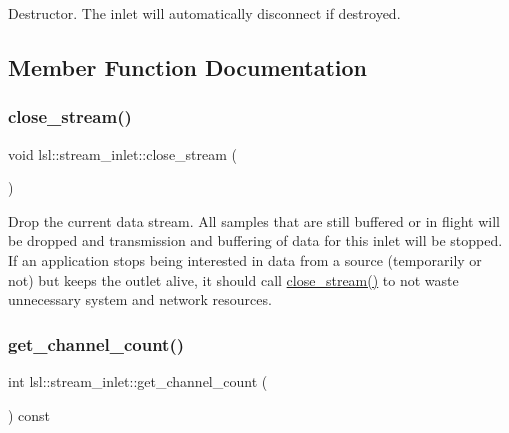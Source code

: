 Destructor. The inlet will automatically disconnect if destroyed. 

\subsection{Member Function Documentation}
\mbox{\label{classlsl_1_1stream__inlet_a77c2f10ed843723c7473aa52dcf544a0}} 
\subsubsection{\texorpdfstring{close\+\_\+stream()}{close\_stream()}}
{\footnotesize\ttfamily void lsl\+::stream\+\_\+inlet\+::close\+\_\+stream (\begin{DoxyParamCaption}{ }\end{DoxyParamCaption})\hspace{0.3cm}{\ttfamily [inline]}}

Drop the current data stream. All samples that are still buffered or in flight will be dropped and transmission and buffering of data for this inlet will be stopped. If an application stops being interested in data from a source (temporarily or not) but keeps the outlet alive, it should call \hyperlink{classlsl_1_1stream__inlet_a77c2f10ed843723c7473aa52dcf544a0}{close\+\_\+stream()} to not waste unnecessary system and network resources. \mbox{\label{classlsl_1_1stream__inlet_ad86702cf94e5b0b850a2f94a228e4f98}} 
\subsubsection{\texorpdfstring{get\+\_\+channel\+\_\+count()}{get\_channel\_count()}}
{\footnotesize\ttfamily int lsl\+::stream\+\_\+inlet\+::get\+\_\+channel\+\_\+count (\begin{DoxyParamCaption}{ }\end{DoxyParamCaption}) const\hspace{0.3cm}{\ttfamily [inline]}}

